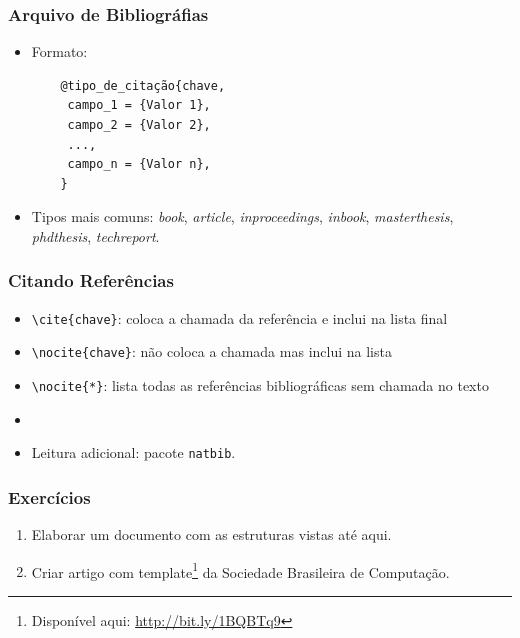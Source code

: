 \begin{frame}[fragile]
\frametitle{Arquivo de Bibliográfias}

\begin{itemize}
  \item Formato:
  \begin{framed}
  \begin{verbatim}
	@tipo_de_citação{chave, 
	 campo_1 = {Valor 1},
	 campo_2 = {Valor 2},
	 ...,
     campo_n = {Valor n},
	}
  \end{verbatim}
  \end{framed}
  \item Tipos mais comuns: \textit{book}, \textit{article}, \textit{inproceedings},
  \textit{inbook}, \textit{masterthesis},
  \textit{phdthesis}, \textit{techreport}.
\end{itemize}
 
\end{frame}

\begin{frame}[fragile]
\frametitle{Citando Referências}


\begin{itemize}
  \item \verb|\cite{chave}|: coloca a chamada da referência e inclui na lista final
  \item \verb|\nocite{chave}|: não coloca a chamada mas inclui na lista
  \item \verb|\nocite{*}|: lista todas as referências bibliográficas sem chamada no texto
  \item[] 
  \item Leitura adicional: pacote \texttt{natbib}.
\end{itemize}
 
\end{frame}

\begin{frame}
\frametitle{Exercícios}


\begin{enumerate}
  \item Elaborar um documento com as estruturas vistas até aqui.
  \item Criar artigo com template\footnote{Disponível aqui: \url{http://bit.ly/1BQBTq9}} da
  Sociedade Brasileira de Computação.
\end{enumerate}
 
\end{frame}

